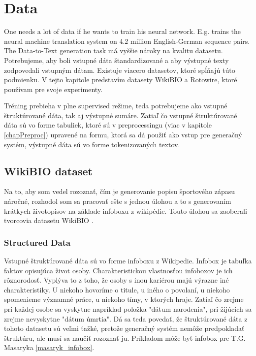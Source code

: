 \chapter{Data}

One needs a lot of data if he wants to train his neural network. E.g. \citep{sennrich2016} trains the neural machine translation system on 4.2 million English-German sequence pairs. The Data-to-Text generation task má vyššie nároky na kvalitu datasetu. Potrebujeme, aby boli vstupné dáta štandardizované a aby výstupné texty zodpovedali vstupným dátam. Existuje viacero datasetov, ktoré spĺňajú túto podmienku. V tejto kapitole predstavím datasety WikiBIO a Rotowire, ktoré používam pre svoje experimenty.

Tréning prebieha v plne supervised režime, teda potrebujeme ako vstupné štruktúrované dáta, tak aj výstupné sumáre. Zatiaľ čo vstupné štruktúrované dáta sú vo forme tabuliek, ktoré sú v preprocessingu (viac v kapitole \ref{chapPreproc}) upravené na formu, ktorá sa dá použiť ako vstup pre generačný systém, výstupné dáta sú vo forme tokenizovaných textov.

\section{WikiBIO dataset}

Na to, aby som vedel rozoznať, čím je generovanie popisu športového zápasu náročné, rozhodol som sa pracovať ešte s jednou úlohou a to s generovaním krátkych životopisov na základe infoboxu z wikipédie. Touto úlohou sa zaoberali tvorcovia datasetu WikiBIO \citep{lebret2016neural}.

\subsection{Structured Data}

Vstupné štruktúrované dáta sú vo forme infoboxu z Wikipedie. Infobox je tabuľka faktov opisujúca život osoby. Charakteristickou vlastnosťou infoboxov je ich rôznorodosť. Vyplýva to z toho, že osoby s inou kariérou majú výrazne iné charakteristiky.  U niekoho hovoríme o titule, u iného o povolaní, u niekoho spomenieme významné práce, u niekoho tímy, v ktorých hraje. Zatiaľ čo zrejme pri každej osobe sa vyskytne napríklad položka "dátum narodenia", pri žijúcich sa zrejme nevyskytne "dátum úmrtia". Dá sa teda povedať, že štruktúrované dáta z tohoto datasetu sú veľmi ťažké, pretože generačný systém nemôže predpokladať štruktúru, ale musí sa naučiť rozoznať ju. Príkladom môže byť infobox pre T.G. Masaryka \ref{masaryk_infobox}.

